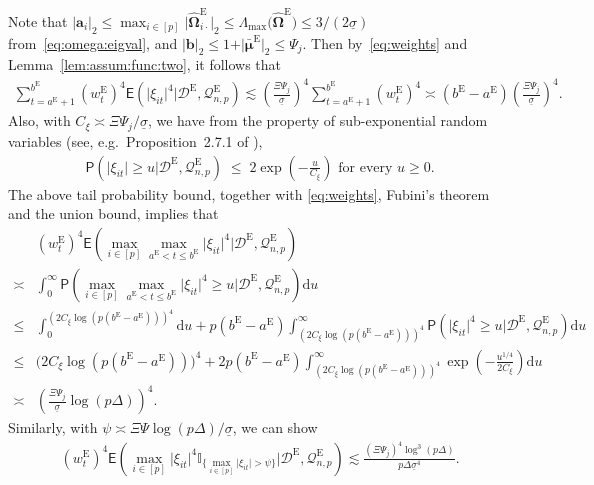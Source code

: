 \documentclass[11pt, a4paper]{article}
\newcommand{\mbf}{\mathbf}
\newcommand{\mc}{\mathcal}
\renewcommand{\l}{\left}
\renewcommand{\r}{\right}
\def\wh{\widehat}
\newcommand{\E}[0]{\mathsf{E}}
\newcommand{\p}{\mathsf{P}}
\newcommand{\nn}{\nonumber}
\newcommand{\tE}{\text{E}}
\theoremstyle{definition}
\theoremstyle{definition}
\theoremstyle{definition}
\theoremstyle{definition}
\theoremstyle{definition}
\theoremstyle{remark}
\theoremstyle{definition}
\theoremstyle{definition}
\theoremstyle{definition}
\begin{document}
Note that $\vert \mbf a_i \vert_2 \le \max_{i \in [p]} \vert \wh{\bm\Omega}^{\tE}_{i \cdot} \vert_2 \le \Lambda_{\max}\bigl(\wh{\bm\Omega}^{\tE}\bigr) \le 3/(2\underline{\sigma})$ from~\eqref{eq:omega:eigval}, 
and $\vert \mbf b \vert_2 \le 1 + \vert \bar{\bm\mu}^{\tE} \vert_2 \le \Psi_j$. 
Then by~\eqref{eq:weights} and Lemma~\ref{lem:assum:func:two}, it follows that
\begin{align}\label{eq:sum4m}
\sum_{t = a^{\tE} + 1}^{b^{\tE}} (w^{\tE}_t)^4 \E\l( \vert \xi_{it} \vert^4  \big\vert \mc D^{\tE}, \mc Q^{\tE}_{n, p} \r)  \lesssim \l(\frac{\Xi \Psi_j}{\underline\sigma}\r)^4 \sum_{t = a^{\tE} + 1}^{b^{\tE}} (w^{\tE}_t)^4 \asymp 
(b^{\tE} - a^{\tE})\l(\frac{\Xi \Psi_j}{\underline\sigma}\r)^4.
\end{align}
Also, with $C_{\xi} \asymp \Xi\Psi_j/\underline{\sigma}$, we have from the property of sub-exponential random variables (see, e.g.\ Proposition~2.7.1 of \citealp{Ver18}),
\begin{align*}
\p\l( \vert \xi_{it} \vert \ge u \big\vert \mc D^{\tE},  \mc Q^{\tE}_{n, p} \r)\; \le \; 2\exp\l(-\frac{u}{C_\xi}\r) \text{ \ for every \ } u \ge 0.
\end{align*}
The above tail probability bound, together with \eqref{eq:weights}, Fubini's theorem and the union bound, implies that
\begin{align}\label{eq:max4m}
&(w^{\tE}_t)^4 \E\l(\max_{i \in [p]}\max_{a^{\tE} < t \le b^{\tE}}\vert\xi_{it}\vert^4\Big\vert\mc D^{\tE}, \mc Q^{\tE}_{n, p} \r)
\nn \\ 
\asymp & \int_{0}^\infty \p\l(\max_{i \in [p]}\max_{a^{\tE} < t \le b^{\tE}}\vert\xi_{it}\vert^4 \ge u \big\vert \mc D^{\tE}, \mc Q^{\tE}_{n, p} \r) \mathrm{d}u 
\nn \\
\le & \int_0^{(2C_{\xi}\log(p(b^\tE-a^\tE)))^4} \mathrm{d}u + p(b^\tE-a^\tE)\int_{(2C_{\xi}\log(p(b^\tE-a^\tE)))^4}^\infty  \p\l(\vert\xi_{it}\vert^4 \ge u \big\vert \mc D^{\tE}, \mc Q^{\tE}_{n, p} \r)\mathrm{d}u 
\nn \\
\le & \bigl(2C_{\xi}\log(p(b^\tE-a^\tE))\bigr)^4 + 2 p (b^\tE - a^\tE) \int_{(2C_{\xi}\log(p(b^\tE-a^\tE)))^4}^\infty \exp\l(-\frac{u^{1/4}}{2C_{\xi}}\r) \mathrm{d}u
\nn \\
\asymp & \l(\frac{\Xi\Psi_j}{\underline{\sigma}} \log(p\Delta)\r)^4.
\end{align}
Similarly, with $\psi \asymp \Xi\Psi \log(p\Delta) / \underline{\sigma}$, we can show
\begin{align}\label{eq:tail4m}
(w^{\tE}_t)^4 \E\l( \max_{i \in [p]} \vert\xi_{it}\vert^4 \mathbb{I}_{\{\max_{i \in [p]}\vert\xi_{it}\vert > \psi \}} \Big\vert \mc D^{\tE}, \mc Q^{\tE}_{n, p} \r) \lesssim \frac{(\Xi\Psi_j)^4\log^3(p\Delta)}{p\Delta\underline{\sigma}^4}.
\end{align}
\end{document}
